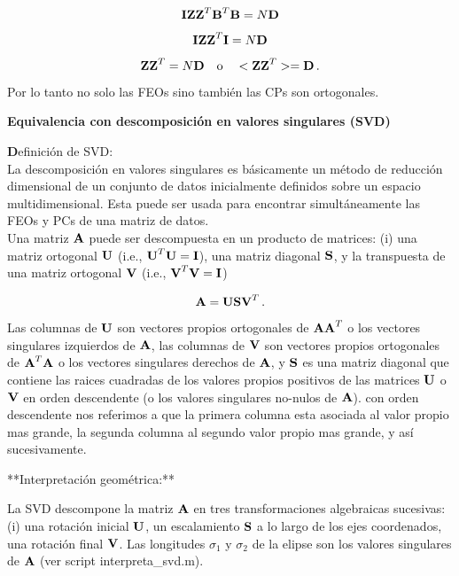 \documentclass[
]{agujournal2019}
\begin{document}
\[{\textbf I}{\textbf Z}{\textbf Z}^T{\textbf B}^T{\textbf B}=
N{\textbf D}\]

\[{\textbf I}{\textbf Z}{\textbf Z}^T{\textbf I}=N{\textbf D}\]

\[{\textbf Z}{\textbf Z}^T=N{\textbf D}\,\,\,\,\,\,{\rm o}\,\,\,\,\,\,<{\textbf Z}{\textbf Z}^T>={\textbf D}\,.\]

Por lo tanto no solo las FEOs sino también las CPs son ortogonales.

\vspace{0.25cm}

\textbf{Equivalencia con descomposición en valores singulares (SVD)}

\begin{framed}
{ \textbf Definición de SVD:}
\\
La descomposición en valores singulares es básicamente un método de
reducción dimensional de un conjunto de datos inicialmente definidos sobre
un espacio multidimensional. Esta puede ser usada para encontrar simultáneamente
las FEOs y PCs de una matriz de datos.
\\

Una matriz ${\textbf A}$ puede ser descompuesta en un producto de
matrices: (i) una matriz ortogonal ${\textbf U}$ (i.e., ${\textbf U}^T{\textbf U}={\textbf I}$), una matriz
diagonal ${\textbf S}$, y la transpuesta de una matriz ortogonal
${\textbf V}$ (i.e., ${\textbf V}^T{\textbf V}={\textbf I}$)

$${\textbf A}={\textbf U}{\textbf S}{\textbf V}^T\,.$$

Las columnas de ${\textbf U}$ son vectores propios ortogonales de
${\textbf A}{\textbf A}^T$ o los vectores singulares izquierdos de ${\textbf A}$,
las columnas de ${\textbf V}$ son vectores propios ortogonales de
${\textbf A}^T{\textbf A}$ o los vectores singulares derechos de ${\textbf A}$,
y ${\textbf S}$ es una matriz diagonal que contiene las raices cuadradas
de los valores propios positivos de las matrices  ${\textbf U}$ o ${\textbf V}$
en orden descendente (o los valores singulares no-nulos de ${\textbf A}$). con orden
descendente nos referimos a que la primera
columna esta asociada al valor propio mas grande, la segunda columna al
segundo valor propio mas grande, y así sucesivamente.
\

**Interpretación geométrica:**

La SVD descompone la matriz ${\textbf A}$ en tres transformaciones
algebraicas sucesivas: (i) una rotación inicial ${\textbf U}$, un escalamiento ${\textbf S}$ a lo largo de los ejes coordenados, una
rotación final ${\textbf V}$. Las longitudes $\sigma_1$ y $\sigma_2$ de
la elipse son los valores singulares de ${\textbf A}$ (ver script interpreta\_svd.m).

\end{framed}
\end{document}
